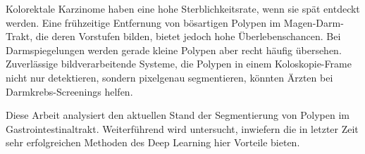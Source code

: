 Kolorektale Karzinome haben eine hohe Sterblichkeitsrate, wenn sie spät entdeckt werden.
Eine frühzeitige Entfernung von bösartigen Polypen im Magen-Darm-Trakt, die deren Vorstufen bilden, bietet jedoch hohe Überlebenschancen.
Bei Darmspiegelungen werden gerade kleine Polypen aber recht häufig übersehen.
Zuverlässige bildverarbeitende Systeme, die Polypen in einem Koloskopie-Frame nicht nur detektieren, sondern pixelgenau segmentieren, könnten Ärzten bei Darmkrebs-Screenings helfen.

Diese Arbeit analysiert den aktuellen Stand der Segmentierung von Polypen im Gastrointestinaltrakt. Weiterführend wird untersucht, inwiefern die in letzter Zeit sehr erfolgreichen Methoden des Deep Learning hier Vorteile bieten.
